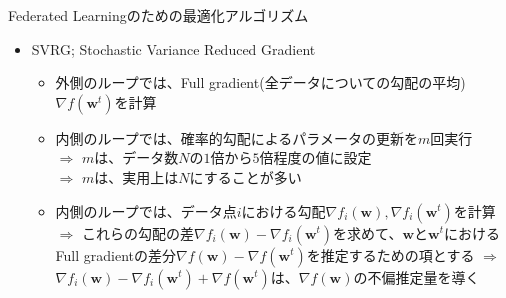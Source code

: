 \documentclass[dvipdfmx,notheorems,t]{beamer}
\begin{document}
\begin{frame}{Federated Learningのための最適化アルゴリズム}

\begin{itemize}
	\item SVRG; Stochastic Variance Reduced Gradient
	\begin{itemize}
		\item 外側のループでは、Full gradient(全データについての勾配の平均)$\nabla f(\bm{w}^t)$を計算
		\item 内側のループでは、確率的勾配によるパラメータの更新を$m$回実行 \\
		$\Rightarrow$ $m$は、データ数$N$の$1$倍から$5$倍程度の値に設定 \\
		$\Rightarrow$ $m$は、実用上は$N$にすることが多い
		\newline
		
		\item 内側のループでは、データ点$i$における勾配$\nabla f_i(\bm{w}), \nabla f_i(\bm{w}^t)$を計算 \newline \newline
		$\Rightarrow$ これらの勾配の差$\nabla f_i(\bm{w}) - \nabla f_i(\bm{w}^t)$を求めて、$\bm{w}$と$\bm{w}^t$におけるFull gradientの差分$\nabla f(\bm{w}) - \nabla f(\bm{w}^t)$を推定するための項とする \newline \newline
		$\Rightarrow$ $\nabla f_i(\bm{w}) - \nabla f_i(\bm{w}^t) + \nabla f(\bm{w}^t)$は、$\nabla f(\bm{w})$の\alert{不偏推定量}を導く
	\end{itemize}
\end{itemize}

\end{frame}
\end{document}
